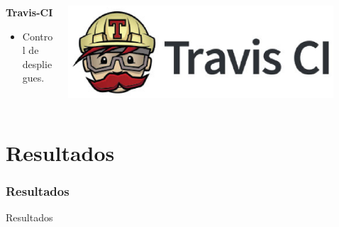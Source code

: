 \documentclass{beamer}
\begin{document}
\begin{frame}[allowframebreaks]
  \begin{columns}
    \begin{column}{5cm}
    	{\bfseries Travis-CI}
   		\bigskip
   		 \begin{itemize}
        	\item Control de despliegues.
      	\end{itemize}
    \end{column}
    \begin{column}{5cm}
        \includegraphics[width=0.9\textwidth]{images/travis-ci-logo.eps}
    \end{column}
  \end{columns}
  
\end{frame}


\section{Resultados}
\begin{frame}
\frametitle{Resultados}
  
  \begin{center}
    \Huge{Resultados}
  \end{center}
\end{frame}
\end{document}
